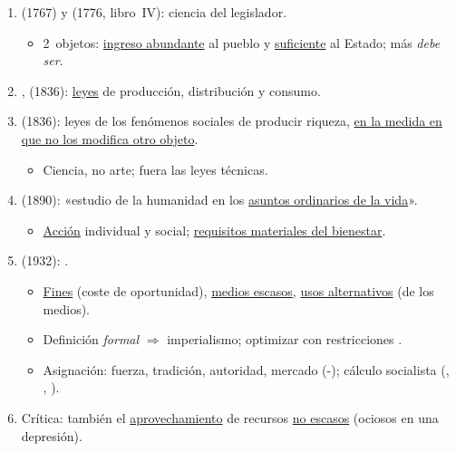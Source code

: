 \documentclass{article}
\begin{document}
\begin{columnas}
\begin{enumerate}
\item {} (1767) y  (1776, libro~IV): ciencia del legislador.
  \begin{itemize}
  \item 2~objetos: \uline{ingreso abundante} al pueblo y \uline{suficiente} al Estado; más \emph{debe ser}.
  \end{itemize}
\item {},  (1836): \uline{leyes} de producción, distribución y consumo.
\item {} (1836): leyes de los fenómenos sociales de producir riqueza, \uline{en la medida en que no los modifica otro objeto}.
  \begin{itemize}
  \item Ciencia, no arte; fuera las leyes técnicas.
  \end{itemize}
\end{enumerate}
\begin{enumerate}\setcounter{enumi}{3}
\item {} (1890): «estudio de la humanidad en los \uline{asuntos ordinarios de la vida}».
  \begin{itemize}
  \item \uline{Acción} individual y social; \uline{requisitos materiales del bienestar}.
  \end{itemize}
\end{enumerate}
\begin{enumerate}\setcounter{enumi}{4}
\item {} (1932): .
  \begin{itemize}
  \item \uline{Fines} (coste de oportunidad), \uline{medios escasos}, \uline{usos alternativos} (de los medios).
  \item Definición \emph{formal} $\Rightarrow$ imperialismo; optimizar con restricciones .
  \item Asignación: fuerza, tradición, autoridad, mercado (-); cálculo socialista (, , ).
  \end{itemize}
\item Crítica: también el \uline{aprovechamiento} de recursos \uline{no escasos} (ociosos en una depresión).

\end{enumerate}
\end{columnas}
\end{document}
